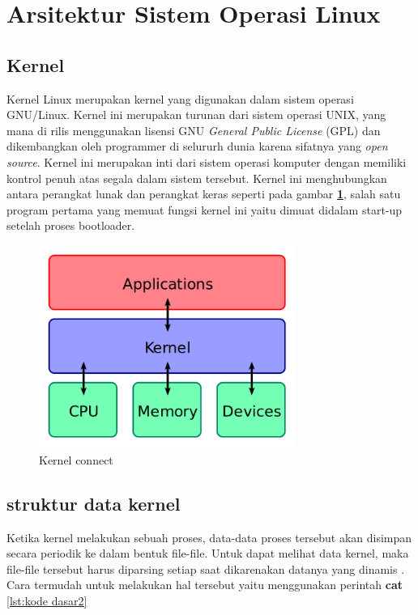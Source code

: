 \section{Arsitektur Sistem Operasi Linux}
\subsection{Kernel}
	Kernel Linux merupakan kernel yang digunakan dalam sistem operasi GNU/Linux. Kernel ini merupakan turunan dari sistem operasi UNIX, yang mana di rilis menggunakan lisensi GNU \textit{General Public License} (GPL) dan dikembangkan oleh programmer di selururh dunia karena sifatnya yang \textit{open source}. Kernel ini merupakan inti dari sistem operasi komputer dengan memiliki kontrol penuh atas segala dalam sistem tersebut. Kernel ini menghubungkan antara perangkat lunak dan perangkat keras seperti pada gambar \textbf{\ref{kernel}}, salah satu program pertama yang memuat fungsi kernel ini yaitu dimuat didalam start-up setelah proses bootloader.

\begin{figure}[!htbp]
\centerline{\includegraphics[width=0.75\textwidth]{Figures/Kernel_Layout.png}}
\caption{Kernel connect}
\label{kernel}
\end{figure}



\subsection{struktur data kernel}
	Ketika kernel melakukan sebuah proses, data-data proses tersebut akan disimpan secara periodik ke dalam bentuk file-file. Untuk dapat melihat data kernel, maka file-file tersebut harus diparsing setiap saat dikarenakan datanya yang dinamis \cite{raharja2001pengenalan}. Cara termudah untuk melakukan hal tersebut yaitu menggunakan perintah \textbf{cat} \ref{lst:kode dasar2}

